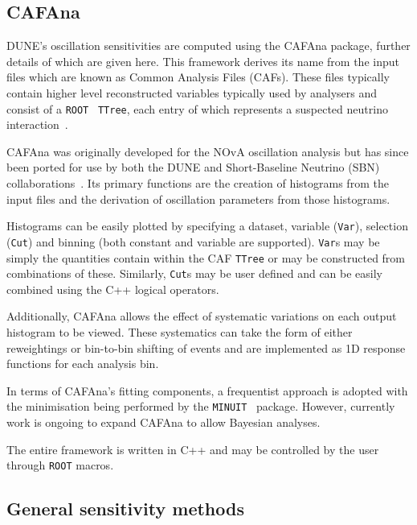 \subsection{CAFAna}
\label{sec:dune_lbl:sensitivities:cafana}

DUNE's oscillation sensitivities are computed using the CAFAna package, further details of which are given here.
This framework derives its name from the input files which are known as Common Analysis Files (CAFs).
These files typically contain higher level reconstructed variables typically used by analysers and consist of a \texttt{ROOT}~\cite{root} \texttt{TTree}, each entry of which represents a suspected neutrino interaction~\cite{backhouse2015}.

CAFAna was originally developed for the NOvA oscillation analysis but has since been ported for use by both the DUNE and Short-Baseline Neutrino (SBN) collaborations~\cite{cafana}.
Its primary functions are the creation of histograms from the input files and the derivation of oscillation parameters from those histograms.

Histograms can be easily plotted by specifying a dataset, variable (\texttt{Var}), selection (\texttt{Cut}) and binning (both constant and variable are supported). 
\texttt{Var}s may be simply the quantities contain within the CAF \texttt{TTree} or may be constructed from combinations of these.
Similarly, \texttt{Cut}s may be user defined and can be easily combined using the C++ logical operators.

Additionally, CAFAna allows the effect of systematic variations on each output histogram to be viewed. 
These systematics can take the form of either reweightings or bin-to-bin shifting of events and are implemented as 1D response functions for each analysis bin.

In terms of CAFAna's fitting components, a frequentist approach is adopted with the minimisation being performed by the \texttt{MINUIT}~\cite{minuit} package.
However, currently work is ongoing to expand CAFAna to allow Bayesian analyses.

The entire framework is written in C++ and may be controlled by the user through \texttt{ROOT} macros.

\subsection{General sensitivity methods}
\label{sec:dune_lbl:sensitivities:general}


